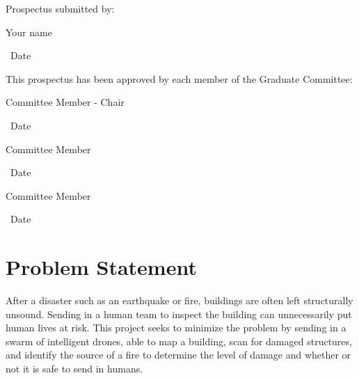 \documentclass[12pt, letterpaper]{article}
\begin{document}
\hspace*{.47in}
\begin{minipage}[c]{5.25in}

\normalsize

Prospectus submitted by:

\vspace{.5in}

\makebox[2in]{\hrulefill} \hspace{1in} \makebox[2in]{\hrulefill}

\parbox[b]{3in}{Your name} \, Date
\vspace{0.5in}

This prospectus has been approved by each member of the Graduate Committee:
\vspace{0.5in}

\makebox[2in]{\hrulefill} \hspace{1in} \makebox[2in]{\hrulefill}

\parbox[b]{3in}{Committee Member - Chair} \, Date
\vspace{0.4in}

\makebox[2in]{\hrulefill} \hspace{1in} \makebox[2in]{\hrulefill}

\parbox[b]{3in}{Committee Member} \, Date
\vspace{0.4in}

\makebox[2in]{\hrulefill} \hspace{1in} \makebox[2in]{\hrulefill}

\parbox[b]{3in}{Committee Member} \, Date

\end{minipage}

\vspace*{\fill}

\pagebreak

\setcounter{page}{1}

\section{Problem Statement}
After a disaster such as an earthquake or fire, buildings are often left structurally unsound. Sending in a human team to inspect the building can unnecessarily put human lives at risk. This project seeks to minimize the problem by sending in a swarm of intelligent drones, able to map a building, scan for damaged structures, and identify the source of a fire to determine the level of damage and whether or not it is safe to send in humans. 
\end{document}
